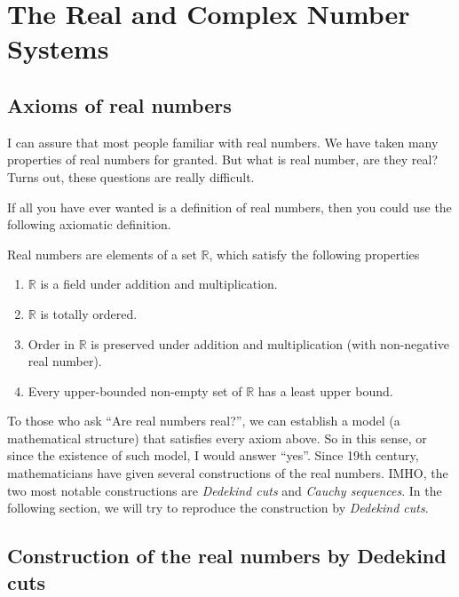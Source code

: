 \chapter{The Real and Complex Number Systems}

\section{Axioms of real numbers}

\par I can assure that most people familiar with real numbers. We have taken many properties of real numbers for granted. But what is real number, are they real? Turns out, these questions are really difficult.

\par If all you have ever wanted is a definition of real numbers, then you could use the following axiomatic definition.

\par Real numbers are elements of a set $\mathbb{R}$, which satisfy the following properties
\begin{enumerate}[label = (\roman*)]
    \item $\mathbb{R}$ is a field under addition and multiplication.
    \item $\mathbb{R}$ is totally ordered.
    \item Order in $\mathbb{R}$ is preserved under addition and multiplication (with non-negative real number).
    \item Every upper-bounded non-empty set of $\mathbb{R}$ has a least upper bound.
\end{enumerate}

\par To those who ask ``Are real numbers real?\@'', we can establish a model (a mathematical structure) that satisfies every axiom above. So in this sense, or since the existence of such model, I would answer ``yes''. Since 19th century, mathematicians have given several constructions of the real numbers. IMHO, the two most notable constructions are \textit{Dedekind cuts} and \textit{Cauchy sequences}. In the following section, we will try to reproduce the construction by \textit{Dedekind cuts}.

\section{Construction of the real numbers by Dedekind cuts}


